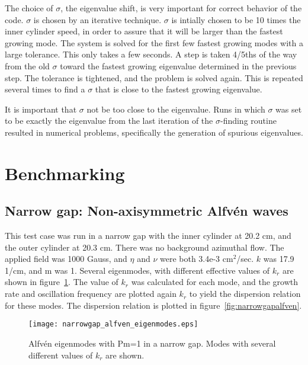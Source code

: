 \documentclass[letterpaper]{article}
\begin{document}
The choice of $\sigma$, the eigenvalue shift, is very important for correct behavior of the code.  $\sigma$ is chosen by an iterative technique.  $\sigma$ is intially chosen to be 10 times the inner cylinder speed, in order to assure that it will be larger than the fastest growing mode.  The system is solved for the first few fastest growing modes with a large tolerance.  This only takes a few seconds.  A step is taken 4/5ths of the way from the old $\sigma$ toward the fastest growing eigenvalue determined in the previous step.  The tolerance is tightened, and the problem is solved again.  This is repeated several times to find a $\sigma$ that is close to the fastest growing eigenvalue.

It is important that $\sigma$ not be too close to the eigenvalue.  Runs in which $\sigma$ was set to be exactly the eigenvalue from the last iteration of the $\sigma$-finding routine resulted in numerical problems, specifically the generation of spurious eigenvalues. 

\section{Benchmarking}

\subsection{Narrow gap: Non-axisymmetric Alfv\'en waves}

This test case was run in a narrow gap with the inner cylinder at 20.2 cm, and the outer cylinder at 20.3 cm.  There was no background azimuthal flow.  The applied field was 1000 Gauss, and $\eta$ and $\nu$ were both 3.4e-3 cm$^2$/sec.  $k$ was 17.9 1/cm, and m was 1.  Several eigenmodes, with different effective values of $k_r$ are shown in figure~\ref{fig:narrowgapalfveneigenmodes}.  The value of $k_r$ was calculated for each mode, and the growth rate and oscillation frequency are plotted again $k_r$ to yield the dispersion relation for these modes.  The dispersion relation is plotted in figure~\ref{fig:narrowgapalfven}.

\begin{figure}
\begin{center}
\texttt{[image: narrowgap\_alfven\_eigenmodes.eps]}
\caption{Alfv\'en eigenmodes with Pm=1 in a narrow gap. Modes with several different values of $k_r$ are shown.}
\label{fig:narrowgapalfveneigenmodes}
\end{center}
\end{figure}
\end{document}
